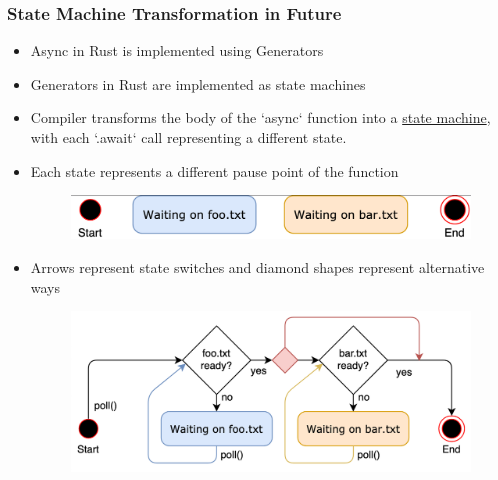 \begin{frame}[fragile]
    \frametitle{State Machine Transformation in Future}
% 
% 
    \begin{itemize}
        \item Async in Rust is implemented using Generators
        \item Generators in Rust are implemented as state machines
        \item Compiler transforms the body of the `async` function into a \href{https://en.wikipedia.org/wiki/Finite-state_machine}{state machine}, with each `.await` call representing a different state.
        \item Each state represents a different pause point of the function
% 
    \begin{figure}
    \includegraphics[width=0.8\linewidth]{figs/async-state-machine-states.png}
    \end{figure}
% 
        \item Arrows represent state switches and diamond shapes represent alternative ways
% 
    \begin{figure}
    \includegraphics[width=0.8\linewidth]{./figs/async-state-machine-basic}
    \end{figure}
    \end{itemize}
% 
\end{frame}
